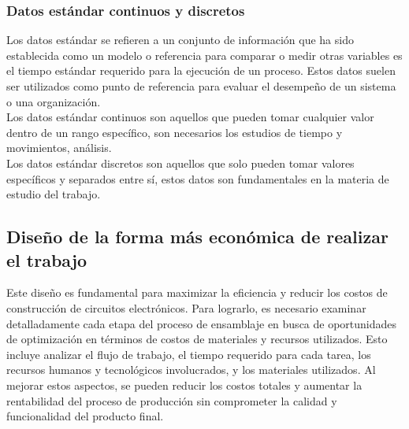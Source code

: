     \subsubsection{Datos estándar continuos y discretos}
    Los datos estándar se refieren a un conjunto de información que ha sido establecida como un modelo o referencia para comparar o medir otras variables es el tiempo estándar requerido para la ejecución de un proceso. Estos datos suelen ser utilizados como punto de referencia para evaluar el desempeño de un sistema o una organización.\\
    Los datos estándar continuos son aquellos que pueden tomar cualquier valor dentro de un rango específico, son necesarios los estudios de tiempo y movimientos, análisis.\\
    Los datos estándar discretos son aquellos que solo pueden tomar valores específicos y separados entre sí, estos datos son fundamentales en la materia de estudio del trabajo.\\
    \subsection{Diseño de la forma más económica de realizar el trabajo}
     Este diseño es fundamental para maximizar la eficiencia y reducir los costos de construcción de circuitos electrónicos. Para lograrlo, es necesario examinar detalladamente cada etapa del proceso de ensamblaje en busca de oportunidades de optimización en términos de costos de materiales y recursos utilizados. Esto incluye analizar el flujo de trabajo, el tiempo requerido para cada tarea, los recursos humanos y tecnológicos involucrados, y los materiales utilizados. Al mejorar estos aspectos, se pueden reducir los costos totales y aumentar la rentabilidad del proceso de producción sin comprometer la calidad y funcionalidad del producto final.
